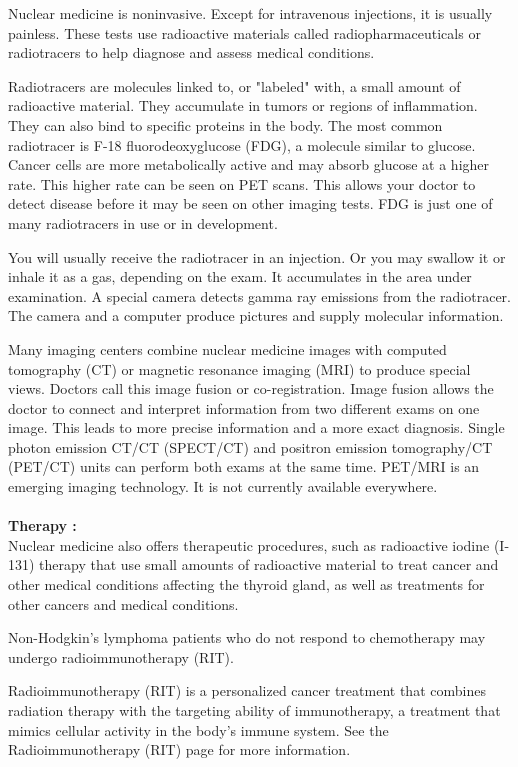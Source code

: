\documentclass[12pt]{article}
\begin{document}
\noindent Nuclear medicine is noninvasive. Except for intravenous injections, it is usually painless. These tests use radioactive materials called radiopharmaceuticals or radiotracers to help diagnose and assess medical conditions.

\noindent Radiotracers are molecules linked to, or "labeled" with, a small amount of radioactive material. They accumulate in tumors or regions of inflammation. They can also bind to specific proteins in the body. The most common radiotracer is F-18 fluorodeoxyglucose (FDG), a molecule similar to glucose. Cancer cells are more metabolically active and may absorb glucose at a higher rate. This higher rate can be seen on PET scans. This allows your doctor to detect disease before it may be seen on other imaging tests. FDG is just one of many radiotracers in use or in development.

\noindent You will usually receive the radiotracer in an injection. Or you may swallow it or inhale it as a gas, depending on the exam. It accumulates in the area under examination. A special camera detects gamma ray emissions from the radiotracer. The camera and a computer produce pictures and supply molecular information.

 
\noindent Many imaging centers combine nuclear medicine images with computed tomography (CT) or magnetic resonance imaging (MRI) to produce special views. Doctors call this image fusion or co-registration. Image fusion allows the doctor to connect and interpret information from two different exams on one image. This leads to more precise information and a more exact diagnosis. Single photon emission CT/CT (SPECT/CT) and positron emission tomography/CT (PET/CT) units can perform both exams at the same time. PET/MRI is an emerging imaging technology. It is not currently available everywhere.
\noindent 
\\ \\ \textbf{\large Therapy :}
\\ Nuclear medicine also offers therapeutic procedures, such as radioactive iodine (I-131) therapy that use small amounts of radioactive material to treat cancer and other medical conditions affecting the thyroid gland, as well as treatments for other cancers and medical conditions.

\noindent Non-Hodgkin's lymphoma patients who do not respond to chemotherapy may undergo radioimmunotherapy (RIT).

\noindent Radioimmunotherapy (RIT) is a personalized cancer treatment that combines radiation therapy with the targeting ability of immunotherapy, a treatment that mimics cellular activity in the body's immune system. See the Radioimmunotherapy (RIT) page for more information.\\
\end{document}
